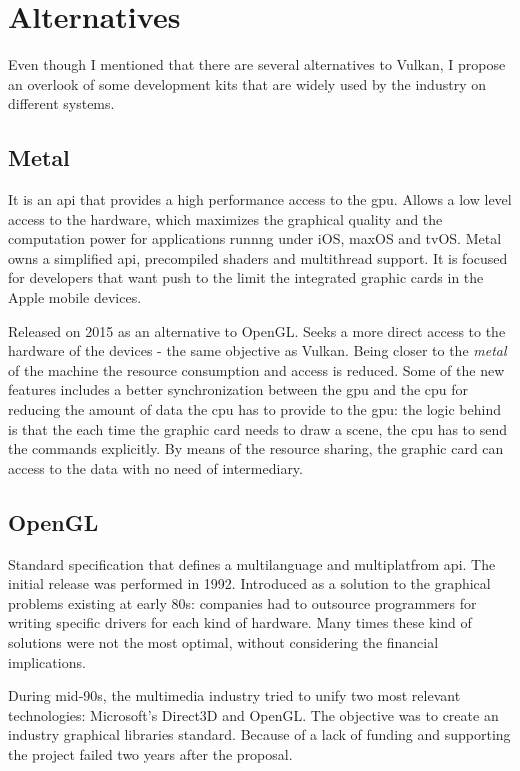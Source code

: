 \chapter{Alternatives}
Even though I mentioned that there are several alternatives to Vulkan, I propose an overlook of some development
kits that are widely used by the industry on different systems.

\section{Metal}
It is an \gls{api} that provides a high performance access to the \gls{gpu}. Allows a low level access to the hardware,
which maximizes the graphical quality and the computation power for applications runnng under iOS, maxOS and tvOS. Metal
owns a simplified \gls{api}, precompiled shaders and multithread support. It is focused for developers that want push
to the limit the integrated graphic cards in the Apple mobile devices.

Released on 2015 as an alternative to OpenGL. Seeks a more direct access to the hardware of the devices - the same
objective as Vulkan. Being closer to the \emph{metal} of the machine the resource consumption and access is reduced.
Some of the new features includes a better synchronization between the \gls{gpu} and the \gls{cpu} for reducing the
amount of data the \gls{cpu} has to provide to the \gls{gpu}: the logic behind is that the each time the graphic card
needs to draw a scene, the \gls{cpu} has to send the commands explicitly. By means of the resource sharing, the graphic
card can access to the data with no need of intermediary.

\section{OpenGL}
Standard specification that defines a multilanguage and multiplatfrom \gls{api}. The initial release was performed
in 1992. Introduced as a solution to the graphical problems existing at early 80s: companies had to outsource
programmers for writing specific drivers for each kind of hardware. Many times these kind of solutions were not the
most optimal, without considering the financial implications.

During mid-90s, the multimedia industry tried to unify two most relevant technologies: Microsoft's Direct3D and
OpenGL. The objective was to create an industry graphical libraries standard. Because of a lack of funding and
supporting the project failed two years after the proposal.

